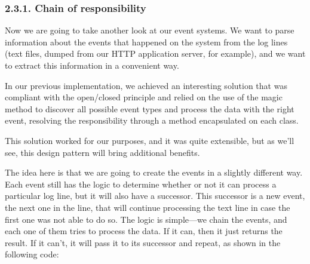 \documentclass[a4paper,10pt,english]{sphinxmanual}
\begin{document}
\subsubsection{2.3.1. Chain of responsibility}
\label{\detokenize{chapters/9_design_patterns/index:chain-of-responsibility}}
Now we are going to take another look at our event systems. We want to parse information
about the events that happened on the system from the log lines (text files, dumped from
our HTTP application server, for example), and we want to extract this information in a
convenient way.

In our previous implementation, we achieved an interesting solution that was compliant
with the open/closed principle and relied on the use of the  magic
method to discover all possible event types and process the data with the right event,
resolving the responsibility through a method encapsulated on each class.

This solution worked for our purposes, and it was quite extensible, but as we’ll see, this
design pattern will bring additional benefits.

The idea here is that we are going to create the events in a slightly different way. Each event
still has the logic to determine whether or not it can process a particular log line, but it will
also have a successor. This successor is a new event, the next one in the line, that will
continue processing the text line in case the first one was not able to do so. The logic is
simple—we chain the events, and each one of them tries to process the data. If it can, then it
just returns the result. If it can’t, it will pass it to its successor and repeat, as shown in the
following code:
\end{document}
